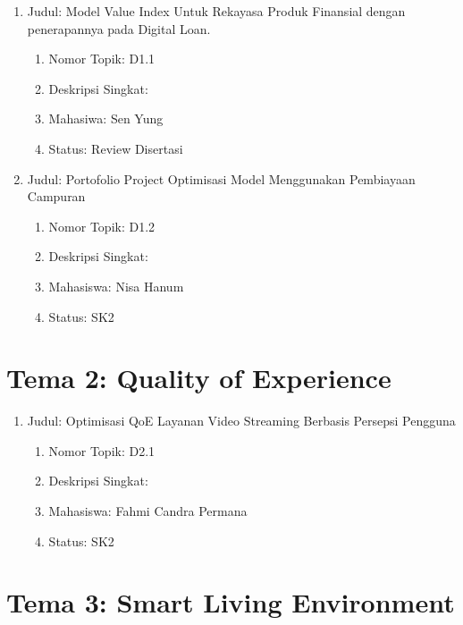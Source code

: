 \documentclass[
  letterpaper,
  DIV=11,
  numbers=noendperiod]{scrreprt}
\begin{document}
\begin{enumerate}
\def\labelenumi{\arabic{enumi}.}
\item
  Judul: Model Value Index Untuk Rekayasa Produk Finansial dengan
  penerapannya pada Digital Loan.

  \begin{enumerate}
  \def\labelenumii{\arabic{enumii}.}
  \item
    Nomor Topik: D1.1
  \item
    Deskripsi Singkat:
  \item
    Mahasiwa: Sen Yung
  \item
    Status: Review Disertasi
  \end{enumerate}
\item
  Judul: Portofolio Project Optimisasi Model Menggunakan Pembiayaan
  Campuran

  \begin{enumerate}
  \def\labelenumii{\arabic{enumii}.}
  \item
    Nomor Topik: D1.2
  \item
    Deskripsi Singkat:
  \item
    Mahasiswa: Nisa Hanum
  \item
    Status: SK2
  \end{enumerate}
\end{enumerate}

\section{Tema 2: Quality of
Experience}\label{tema-2-quality-of-experience-1}

\begin{enumerate}
\def\labelenumi{\arabic{enumi}.}
\item
  Judul: Optimisasi QoE Layanan Video Streaming Berbasis Persepsi
  Pengguna

  \begin{enumerate}
  \def\labelenumii{\arabic{enumii}.}
  \item
    Nomor Topik: D2.1
  \item
    Deskripsi Singkat:
  \item
    Mahasiswa: Fahmi Candra Permana
  \item
    Status: SK2
  \end{enumerate}
\end{enumerate}

\section{Tema 3: Smart Living
Environment}\label{tema-3-smart-living-environment-1}
\end{document}
